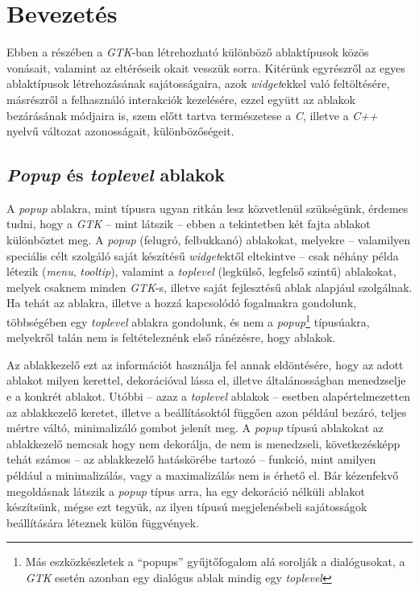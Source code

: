 \section{Bevezetés}

Ebben a részében a \textit{GTK}-ban létrehozható különböző ablaktípusok közös vonásait, valamint az eltéréseik okait vesszük sorra. Kitérünk egyrészről az egyes ablaktípusok létrehozásának sajátosságaira, azok \textit{widget}ekkel való feltöltésére, másrészről a felhasználó interakciók kezelésére, ezzel együtt az ablakok bezárásának módjaira is, szem előtt tartva természetese a \textit{C}, illetve a \textit{C++} nyelvű változat azonosságait, különbözőségeit.

\subsection{\textit{Popup} és \textit{toplevel} ablakok}
\label{sec:windowtype}

A \textit{popup} ablakra, mint típusra ugyan ritkán lesz közvetlenül szükségünk, érdemes tudni, hogy a \textit{GTK} -- mint látszik -- ebben a tekintetben két fajta ablakot különböztet meg. A \textit{popup} (felugró, felbukkanó) ablakokat, melyekre -- valamilyen speciális célt szolgáló saját készítésű \textit{widget}ektől eltekintve -- csak néhány példa létezik (\textit{menu}, \textit{tooltip}), valamint a \textit{toplevel} (legkülső, legfelső szintű) ablakokat, melyek csaknem minden \textit{GTK}-s, illetve saját fejlesztésű ablak alapjául szolgálnak. Ha tehát az ablakra, illetve a hozzá kapcsolódó fogalmakra gondolunk, többségében egy \textit{toplevel} ablakra gondolunk, és nem a \textit{popup}\footnote{Más eszközkészletek a ``popups'' gyűjtőfogalom alá sorolják a dialógusokat, a \textit{GTK} esetén azonban egy dialógus ablak mindig egy \textit{toplevel}} típusúakra, melyekről talán nem is feltételeznénk első ránézésre, hogy ablakok.

Az ablakkezelő ezt az információt használja fel annak eldöntésére, hogy az adott ablakot milyen kerettel, dekorációval lássa el, illetve általánosságban menedzselje e a konkrét ablakot. Utóbbi -- azaz a \textit{toplevel} ablakok -- esetben alapértelmezetten az ablakkezelő keretet, illetve a beállításoktól függően azon például bezáró, teljes mértre váltó, minimalizáló gombot jelenít meg. A \textit{popup} típusú ablakokat az ablakkezelő nemcsak hogy nem dekorálja, de nem is menedzseli, következésképp tehát számos -- az ablakkezelő hatáskörébe tartozó -- funkció, mint amilyen például a minimalizálás, vagy a maximalizálás nem is érhető el. Bár kézenfekvő megoldásnak látszik a \textit{popup} típus arra, ha egy dekoráció nélküli ablakot készítsünk, mégse ezt tegyük, az ilyen típusú megjelenésbeli sajátosságok beállítására léteznek külön függvények.

